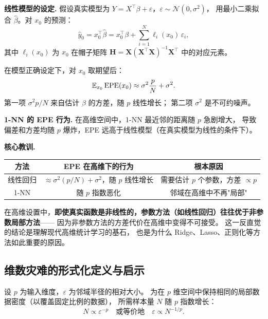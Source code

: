 \textbf{线性模型的设定.}
假设真实模型为 $Y = X^\top \beta + \varepsilon$，$\varepsilon \sim \mathcal{N}(0, \sigma^2)$，
用最小二乘拟合 $\hat{\beta}$。对 $x_0$ 的预测：
\[
\hat{y}_0 = x_0^\top \hat{\beta} = x_0^\top \beta + \sum_{i=1}^{N} \ell_i(x_0)\,\varepsilon_i,
\]
其中 $\ell_i(x_0)$ 为 $x_0$ 在帽子矩阵 $\mathbf{H} = \mathbf{X}(\mathbf{X}^\top\mathbf{X})^{-1}\mathbf{X}^\top$ 中的对应元素。

在模型正确设定下，对 $x_0$ 取期望后：
\begin{equation}\label{eq:epe_linear}
    \mathbb{E}_{x_0}\,\mathrm{EPE}(x_0) \approx \sigma^2 \frac{p}{N} + \sigma^2.
\end{equation}
第一项 $\sigma^2 p/N$ 来自估计 $\beta$ 的方差，随 $p$ 线性增长；
第二项 $\sigma^2$ 是不可约噪声。

\textbf{1-NN 的 EPE 行为.}
在高维空间中，1-NN 最近邻的距离随 $p$ 急剧增大，
导致偏差和方差均随 $p$ 爆炸，EPE 远高于线性模型（在真实模型为线性的条件下）。

\textbf{核心教训.}

\begin{center}
\renewcommand{\arraystretch}{1.4}
\begin{tabular}{c|c|c}
\toprule
\textbf{方法} & \textbf{EPE 在高维下的行为} & \textbf{根本原因} \\
\midrule
线性回归 & $\approx \sigma^2(p/N) + \sigma^2$，随 $p$ 线性增长 & 需要估计 $p$ 个参数，方差 $\propto p$ \\
1-NN & 随 $p$ 指数恶化 & 邻域在高维中不再"局部" \\
\bottomrule
\end{tabular}
\end{center}

在高维设置中，\textbf{即使真实函数是非线性的，参数方法（如线性回归）往往优于非参数局部方法}——
因为非参数方法的方差代价在高维中变得不可接受。
这一反直觉的结论是理解现代高维统计学习的基石，
也是为什么 Ridge、Lasso、正则化等方法如此重要的原因。

\subsection{维数灾难的形式化定义与启示}

\begin{definition}
设 $p$ 为输入维度，$\varepsilon$ 为邻域半径的相对大小。
为在 $p$ 维空间中保持相同的局部数据密度（以覆盖固定比例的数据），
所需样本量 $N$ 随 $p$ 指数增长：
\begin{equation}\label{eq:cod}
    N \propto \varepsilon^{-p} \quad \text{或等价地} \quad \varepsilon \propto N^{-1/p}.
\end{equation}
\end{definition}

